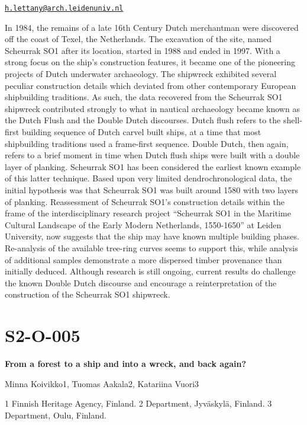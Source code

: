 \documentclass[
]{book}
\begin{document}
\href{mailto:h.lettany@arch.leidenuniv.nl}{\nolinkurl{h.lettany@arch.leidenuniv.nl}}

In 1984, the remains of a late 16th Century Dutch merchantman were discovered off the coast of Texel, the Netherlands. The excavation of the site, named Scheurrak SO1 after its location, started in 1988 and ended in 1997. With a strong focus on the ship's construction features, it became one of the pioneering projects of Dutch underwater archaeology. The shipwreck exhibited several peculiar construction details which deviated from other contemporary European shipbuilding traditions. As such, the data recovered from the Scheurrak SO1 shipwreck contributed strongly to what in nautical archaeology became known as the Dutch Flush and the Double Dutch discourses. Dutch flush refers to the shell-first building sequence of Dutch carvel built ships, at a time that most shipbuilding traditions used a frame-first sequence. Double Dutch, then again, refers to a brief moment in time when Dutch flush ships were built with a double layer of planking. Scheurrak SO1 has been considered the earliest known example of this latter technique. Based upon very limited dendrochronological data, the initial hypothesis was that Scheurrak SO1 was built around 1580 with two layers of planking. Reassessment of Scheurrak SO1's construction details within the frame of the interdisciplinary research project ``Scheurrak SO1 in the Maritime Cultural Landscape of the Early Modern Netherlands, 1550-1650'' at Leiden University, now suggests that the ship may have known multiple building phases. Re-analysis of the available tree-ring curves seems to support this, while analysis of additional samples demonstrate a more dispersed timber provenance than initially deduced. Although research is still ongoing, current results do challenge the known Double Dutch discourse and encourage a reinterpretation of the construction of the Scheurrak SO1 shipwreck.

\hypertarget{s2-o-005}{%
\section*{S2-O-005}\label{s2-o-005}}

\textbf{From a forest to a ship and into a wreck, and back again?}

Minna Koivikko1, Tuomas Aakala2, Katariina Vuori3

1 Finnish Heritage Agency, Finland. 2 Department, Jyväskylä, Finland. 3 Department, Oulu, Finland.
\end{document}
